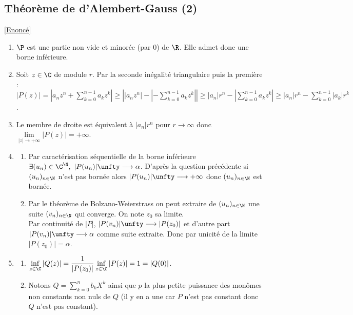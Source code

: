 \documentclass{book}
\begin{document}
	\subsection{Théorème de d'Alembert-Gauss (2) }
	\label{sec:theoreme-de-dalembert-gauss-2}
	\textcolor{blue}{\hyperref[alembertgauss2]{[Enoncé]}}\\
	\begin{enumerate}[leftmargin=*]
		\item $\P$ est une partie non vide et minorée (par $0$) de $\R$. Elle admet donc une borne inférieure.
		\item Soit $z\in \C$ de module $r$. Par la seconde inégalité triangulaire puis la première :\\
		$|P(z)|=\displaystyle\left|a_nz^n+\sum_{k=0}^{n-1}a_kz^k\right|\geq \left||a_nz^n|-\left|-\sum_{k=0}^{n-1}a_kz^k\right|\right|\geq |a_n|r^n-\left|\sum_{k=0}^{n-1}a_kz^k\right|\geq |a_n|r^n-\sum_{k=0}^{n-1}|a_k|r^k$.
		\item Le membre de droite est équivalent à $|a_n|r^n$ pour $r\to\infty$ donc $\lim\limits_{|z|\to+\infty}|P(z)|=+\infty$.
		\item \begin{enumerate}[label=\alph*.]
			\item Par caractérisation séquentielle de la borne inférieure $\exists (u_n)\in \C^\N,\ |P(u_n)|\unfty\longrightarrow\alpha$. D'après la question précédente si $(u_n)_{n\in \N}$ n'est pas bornée alors $|P(u_n)|\unfty\longrightarrow+\infty$ donc $(u_n)_{n\in \N}$ est bornée.
			\item Par le théorème de Bolzano-Weierstrass on peut extraire de $(u_n)_{n\in \N}$ une suite $(v_n)_{n\in \N}$ qui converge. On note $z_0$ sa limite.\\
			Par continuité de $|P|$, $|P(v_n)|\unfty\longrightarrow |P(z_0)|$ et d'autre part $|P(v_n)|\unfty\longrightarrow\alpha$ comme suite extraite. Donc par unicité de la limite $|P(z_0)|=\alpha$.
		\end{enumerate}
		\item \begin{enumerate}[label=\alph*.]
			\item $\displaystyle\inf_{z\in \C}|Q(z)|=\frac{1}{|P(z_0)|}\inf_{z\in \C}|P(z)|=1=|Q(0)|$.
			\item Notons $Q=\displaystyle\sum_{k=0}^nb_kX^k$ ainsi que $p$ la plus petite puissance des monômes non constants non nuls de $Q$ (il y en a une car $P$ n'est pas constant donc $Q$ n'est pas constant).\\

\end{enumerate}
\end{enumerate}
\end{document}
